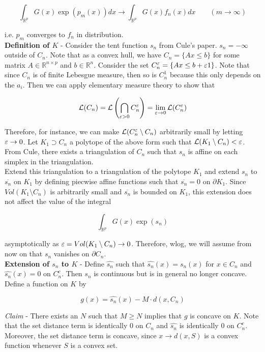 \documentclass[11pt,reqno]{amsart}
\numberwithin{equation}{section}
\newcommand{\lft}{\left(}
\newcommand{\rt}{\right)}
\newcommand{\mr}{\mathbb{R}}
\newcommand{\tb}{\textbf}
\newcommand{\wh}{\widehat}
\newcommand{\mc}{\mathcal}
\newcommand{\pa}{\partial}
\begin{document}
\[
\int_{\mr^p} G(x) \exp(p_m(x)) dx \to \int_{\mr^p} G(x) f_n(x) dx \qquad (m \to \infty) 
\]

i.e. $p_m$ converges to $f_n$ in distribution. \\

\tb{Definition of $K$} - Consider the tent function $s_n$ from Cule's paper. $s_n = -\infty$ outside of $C_n$. Note that as a convex hull, we have $C_n = \{Ax \leq b\}$ for some matrix $A \in \mr^{n \times p}$ and $b \in \mr^n$. Consider the set $C_n^{\varepsilon} = \{Ax \leq b + \varepsilon 1\}$. Note that since $C_n$ is of finite Lebesgue measure, then so is $C_n^1$ because this only depends on the $a_i$. Then we can apply elementary measure theory to show that 

\[
\mc{L}(C_n) = \mc{L} \lft \bigcap_{\eps > 0} C_n^{\eps} \rt = \lim_{\eps \to 0} \mc{L}(C_n^{\eps})
\]

Therefore, for instance, we can make $\mc{L}(C_n^{\eps} \setminus C_n)$ arbitrarily small by letting $\varepsilon \rightarrow 0$. Let $K_1 \supset C_n$ a polytope of the above form such that $\mc{L}(K_1 \setminus C_n) < \eps$. From Cule, there exists a triangulation of $C_n$ such that $s_n$ is affine on each simplex in the triangulation. \\

Extend this triangulation to a triangulation of the polytope $K_1$ and extend $s_n$ to $\overline{s_n}$ on $K_1$ by defining piecwise affine functions such that $\overline{s_n} = 0$ on $\pa K_1$. Since $Vol(K_1 \setminus C_n)$ is arbitrarily small and $\overline{s_n}$ is bounded on $K_1$, this extension does not affect the value of the integral 

\[
\int_{\mr^p} G(x) \exp(s_n) 
\]

asymptotically as $\varepsilon = Vol(K_1 \setminus C_n) \rightarrow 0$. Therefore, wlog, we will assume from now on that $s_n$ vanishes on $\pa C_n$. \\

\tb{Extension of $s_n$ to $K$} - Define $\wh{s_n}$ such that $\wh{s_n}(x) = s_n(x)$ for $x \in C_n$ and $\wh{s_n}(x) = 0$ on $C_n^c$. Then $s_n$ is continuous but is in general no longer concave. Define a function on $K$ by 

\[
g(x) = \widehat{s_n}(x) - M \cdot d(x,C_n) 
\]

\emph{Claim} - There exists an $N$ such that $M \geq N$ implies that $g$ is concave on $K$. Note that the set distance term is identically $0$ on $C_n$ and $\wh{s_n}$ is identically $0$ on $C_n^c$. Moreover, the set distance term is concave, since $x \to d(x,S)$ is a convex function whenever $S$ is a convex set. \\
\end{document}
